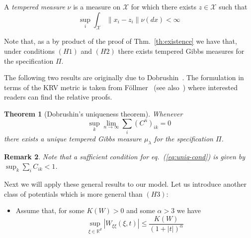 \documentclass[a4paper,12pt,reqno]{amsart}
\newtheorem{theorem}{Theorem}
\newtheorem{remark}[theorem]{Remark}
\newcommand{\eps}{\varepsilon}
\newcommand{\R}{\mathbb{R}}
\newcommand{\Z}{\mathbb{Z}}
\newcommand{\X}{\mathcal{X}}
\begin{document}
A \emph{tempered measure} $\nu$ is a measure on $\X$ for which  there
exists $z \in \X$ such that
$$
\sup_i \int_{\X} \|x_i-z_i\| \nu(dx) < \infty
$$

Note that, as a by product of the proof of Thm.~\ref{th:existence} we
have that, under conditions $(H1)$ and $(H2)$ there exists tempered  Gibbs
measures for the specification $\Pi$.


The following two results are originally due to Dobrushin~\cite{Dobr1,
Dobr2}. The formulation in terms of the KRV metric is taken from
F\"ollmer~\cite{Follmer} (see also~\cite{kuensch}) where interested readers can find the relative proofs.

\begin{theorem}[Dobrushin's uniqueness theorem]
Whenever
\begin{equation}
  \label{eq:uniq-cond}
\sup_k \lim_{n \to \infty} \sum_{i} (C^n)_{ik} = 0  
\end{equation} 
there exists a
unique tempered Gibbs measure $\mu_\lambda$ for the specification $\Pi$.   
\end{theorem}

\begin{remark}
Note that a sufficient condition for eq.~(\ref{eq:uniq-cond}) is given
by $\sup_k \sum_{i} C_{ik} < 1$.   
\end{remark}


Next we will apply these general results to our model.
Let us introduce another class of potentials which is more general
than $(H3)$:
\begin{itemize}
\item[H4)] Assume that, for some $K(W) > 0$ and some $\alpha > 3$ we have
$$
\sup_{\xi \in \R^d} | W_{\xi\xi}(\xi,t)  |   \le \frac{K(W)}{(1+|t|)^{\alpha}}
$$
\end{itemize}
\end{document}
